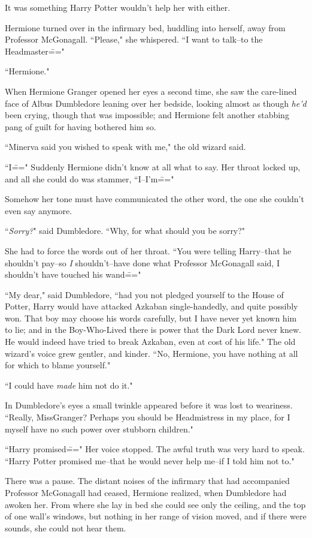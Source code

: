It was something Harry Potter wouldn't help her with either.

Hermione turned over in the infirmary bed, huddling into herself, away from Professor McGonagall. ``Please," she whispered. ``I want to talk\---to the Headmaster\==="

\later

``Hermione."

When Hermione Granger opened her eyes a second time, she saw the care-lined face of Albus Dumbledore leaning over her bedside, looking almost as though \emph{he'd} been crying, though that was impossible; and Hermione felt another stabbing pang of guilt for having bothered him so.

``Minerva said you wished to speak with me," the old wizard said.

``I\===" Suddenly Hermione didn't know at all what to say. Her throat locked up, and all she could do was stammer, ``I\---I'm\==="

Somehow her tone must have communicated the other word, the one she couldn't even say anymore.

``\emph{Sorry?}" said Dumbledore. ``Why, for what should you be sorry?"

She had to force the words out of her throat. ``You were telling Harry\---that he shouldn't pay\---so \emph{I} shouldn't\---have done what Professor McGonagall said, I shouldn't have touched his wand\==="

``My dear," said Dumbledore, ``had you not pledged yourself to the House of Potter, Harry would have attacked Azkaban single-handedly, and quite possibly won. That boy may choose his words carefully, but I have never yet known him to lie; and in the Boy-Who-Lived there is power that the Dark Lord never knew. He would indeed have tried to break Azkaban, even at cost of his life." The old wizard's voice grew gentler, and kinder. ``No, Hermione, you have nothing at all for which to blame yourself."

``I could have \emph{made} him not do it."

In Dumbledore's eyes a small twinkle appeared before it was lost to weariness. ``Really, Miss\?Granger? Perhaps you should be Headmistress in my place, for I myself have no such power over stubborn children."

``Harry promised\===" Her voice stopped. The awful truth was very hard to speak. ``Harry Potter promised me\---that he would never help me\---if I told him not to."

There was a pause. The distant noises of the infirmary that had accompanied Professor McGonagall had ceased, Hermione realized, when Dumbledore had awoken her. From where she lay in bed she could see only the ceiling, and the top of one wall's windows, but nothing in her range of vision moved, and if there were sounds, she could not hear them.


